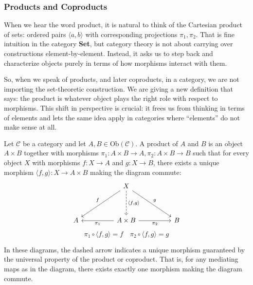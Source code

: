 \subsubsection{\centering Products and Coproducts}

When we hear the word product, it is natural to think of the Cartesian product of sets: ordered pairs $\langle a,b \rangle$ with corresponding projections $\pi_1, \pi_2$. That is fine intuition in the category \textbf{Set}, but category theory is not about carrying over constructions element-by-element. Instead, it asks us to step back and characterize objects purely in terms of how morphisms interact with them.

So, when we speak of products, and later coproducts, in a category, we are not importing the set-theoretic construction. 
We are giving a new definition that says: the product is whatever object plays the right role with respect to morphisms. 
This shift in perspective is crucial: it frees us from thinking in terms of elements and lets the same idea apply in categories where ``elements'' do not make sense at all.

\begin{definition}
  Let $\mathcal{C}$ be a category and let $A,B \in \mathrm{Ob}(\mathcal{C})$.  
  A product of $A$ and $B$ is an object $A \times B$ together with morphisms
  \( \pi_1 : A \times B \to A, \pi_2 : A \times B \to B \) such that for every
  object $X$ with morphisms $f : X \to A$ and $g : X \to B$, there exists a
  unique morphism $\langle f,g \rangle : X \to A \times B$ making the diagram commute:
  \label{def:categoricalproduct}
  \[
    \begin{tikzcd}[row sep=huge, column sep=huge]
      & X \arrow[dl, "f"'] \arrow[dr, "g"] \arrow[d, dashrightarrow, "{\langle f,g \rangle}"] & \\
      A & A \times B \arrow[l, "\pi_1"] \arrow[r, "\pi_2"'] & B
    \end{tikzcd}
  \]
  \[
    \pi_1 \circ \langle f,g \rangle = f
    \quad
    \pi_2 \circ \langle f,g \rangle = g
  \]
\end{definition}

\begin{note}
  In these diagrams, the dashed arrow indicates a unique morphism guaranteed by the universal property of the product or coproduct. That is, for any mediating maps as in the diagram, there exists exactly one morphism making the diagram commute.
\end{note}


